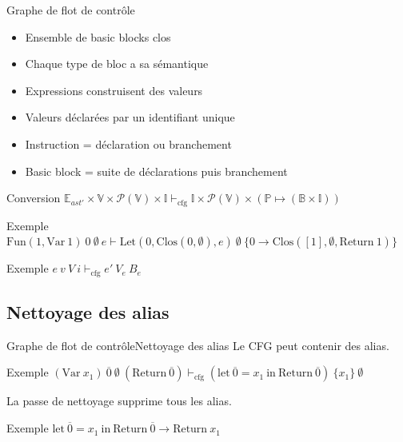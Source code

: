 \documentclass{beamer}
\begin{document}
\begin{frame}{Graphe de flot de contrôle}
    \begin{itemize}
        \item Ensemble de basic blocks \alert{clos}
        \item Chaque type de bloc a sa sémantique
        \item Expressions construisent des valeurs
        \item Valeurs déclarées par un identifiant unique
        \item Instruction = déclaration ou branchement
        \item Basic block = suite de déclarations puis branchement
    \end{itemize}

    \begin{block}{Conversion}
        $\mathbb{E}_{ast'} \times \mathbb{V} \times \mathcal{P}(\mathbb{V}) \times \mathbb{I} \vdash_{\text{cfg}} \mathbb{I} \times \mathcal{P}(\mathbb{V}) \times (\mathbb{P} \mapsto (\mathbb{B} \times \mathbb{I}))$
    \end{block}

    \begin{exampleblock}{Exemple}
        $\text{Fun}(1, \text{Var} ~ 1) ~ 0 ~ \emptyset ~ e \vdash \text{Let}(0, \text{Clos}(0, \emptyset), e) ~ \emptyset ~ \lbrace 0 \rightarrow \text{Clos}([1], \emptyset, \text{Return} ~ 1) \rbrace$
    \end{exampleblock}


    \begin{exampleblock}{Exemple}
        $e ~ v ~ V ~ i \vdash_{\text{cfg}} e' ~ V_e ~ B_e$
    \end{exampleblock}
\end{frame}

\subsection{Nettoyage des alias}

\begin{frame}{Graphe de flot de contrôle}{Nettoyage des alias}
    Le CFG peut contenir des alias.

    \begin{exampleblock}{Exemple}
        $(\text{Var} ~ x_1) ~ \overline{0} ~ \emptyset ~ (\text{Return} ~ \overline{0}) \vdash_{\text{cfg}} (\text{let} ~ \overline{0} = x_1 ~ \text{in} ~ \text{Return} ~ \overline{0}) ~ \lbrace x_1 \rbrace ~ \emptyset$
    \end{exampleblock}

    La passe de nettoyage supprime tous les alias.

    \begin{exampleblock}{Exemple}
        $\text{let} ~ \overline{0} = x_1 ~ \text{in} ~ \text{Return} ~ \overline{0} \rightarrow \text{Return} ~ x_1$
    \end{exampleblock}
\end{frame}
\end{document}
